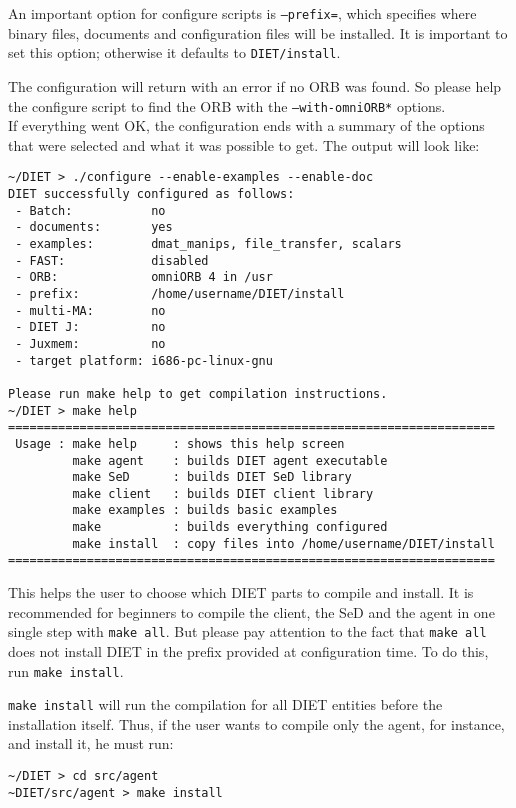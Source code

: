 An important option for configure scripts is \texttt{--prefix=}, which
specifies where binary files, documents and configuration files will
be installed. It is important to set this option; otherwise it 
defaults to \texttt{DIET/install}.

The configuration will return with an error if no ORB was found. So
please help the configure script to find the ORB with the
\texttt{--with-omniORB*} options.\\


If everything went OK, the configuration ends with a summary of the
options that were selected and what it was possible to get. The output
will look like: {\footnotesize
\begin{verbatim}
~/DIET > ./configure --enable-examples --enable-doc
DIET successfully configured as follows:
 - Batch:           no
 - documents:       yes
 - examples:        dmat_manips, file_transfer, scalars
 - FAST:            disabled
 - ORB:             omniORB 4 in /usr
 - prefix:          /home/username/DIET/install
 - multi-MA:        no
 - DIET J:          no
 - Juxmem:          no
 - target platform: i686-pc-linux-gnu
 
Please run make help to get compilation instructions.
~/DIET > make help
====================================================================
 Usage : make help     : shows this help screen
         make agent    : builds DIET agent executable
         make SeD      : builds DIET SeD library
         make client   : builds DIET client library
         make examples : builds basic examples
         make          : builds everything configured
         make install  : copy files into /home/username/DIET/install
====================================================================
\end{verbatim}
}

This helps the user to choose which DIET parts to compile and
install. It is recommended for beginners to compile the client,
the SeD and the agent in one single step with \texttt{make all}. But
please pay attention to the fact that \texttt{make all} does not
install DIET in the prefix provided at configuration time. To do this,
run \texttt{make install}.

\texttt{make install} will run the compilation for all DIET entities
before the installation itself. Thus, if the user wants to compile
only the agent, for instance, and install it, he must run:
{\footnotesize
\begin{verbatim}
~/DIET > cd src/agent
~DIET/src/agent > make install
\end{verbatim}
}


